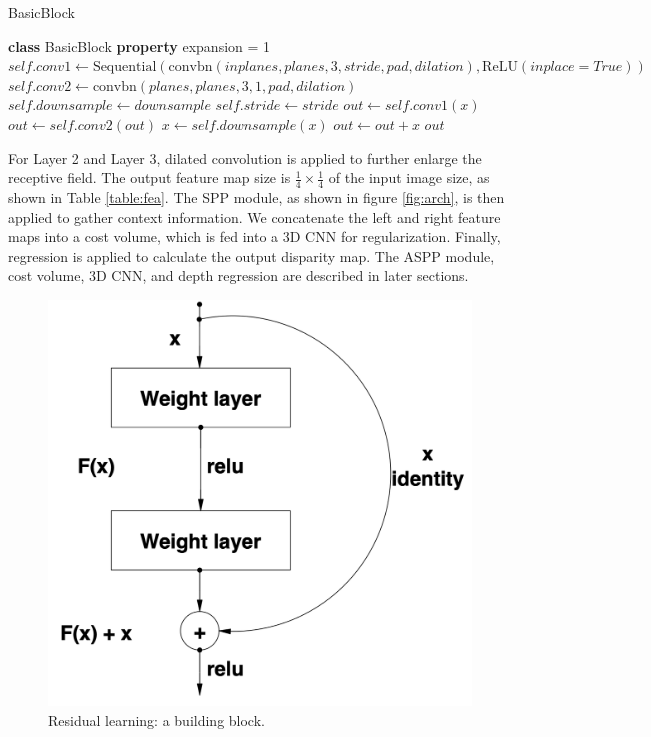 \documentclass[english, LaM, oneside]{sapthesis}%
\begin{document}
\begin{algorithm}
\caption{BasicBlock}
\label{alg:basic_block}
\begin{algorithmic}[1]
\State \textbf{class} BasicBlock
\State \textbf{property} expansion = 1
    \State $self.conv1 \gets \text{Sequential}\left(\text{convbn}(inplanes, planes, 3, stride, pad, dilation), \text{ReLU}(inplace=True)\right)$
    \State $self.conv2 \gets \text{convbn}(planes, planes, 3, 1, pad, dilation)$
    \State $self.downsample \gets downsample$
    \State $self.stride \gets stride$
\EndProcedure
{}
    \State $out \gets self.conv1(x)$
    \State $out \gets self.conv2(out)$
        \State $x \gets self.downsample(x)$
    \EndIf
    \State $out \gets out + x$
    \State \Return $out$
\EndProcedure
\end{algorithmic}
\end{algorithm}

\vspace{1cm}
For Layer 2 and Layer 3, dilated convolution is applied to further enlarge the receptive field. The output feature map size is $\frac{1}{4} \times \frac{1}{4}$ of the input image size, as shown in Table \ref{table:fea}. The SPP module, as shown in figure \ref{fig:arch}, is then applied to gather context information. We concatenate the left and right feature maps into a cost volume, which is fed into a 3D CNN for regularization. Finally, regression is applied to calculate the output disparity map. The ASPP module, cost volume, 3D CNN, and depth regression are described in later sections.

\begin{figure}[h] %
    \centering
    \includegraphics[scale=0.3]{Images/residual.png}
    \caption{ Residual learning: a building block.}
    \label{fig:resi}
\end{figure}
\end{document}
